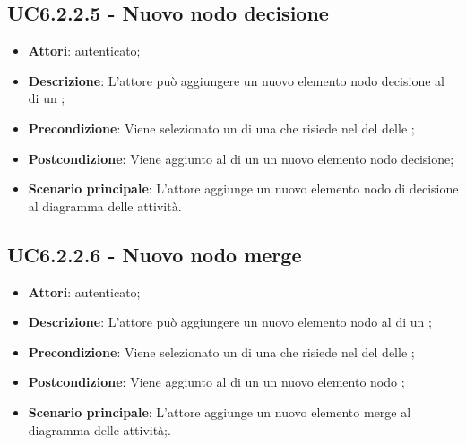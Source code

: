 \subsection{UC6.2.2.5 - Nuovo nodo decisione}
\label{ssec:UC6.2.2.5}
\begin{itemize}
\item \textbf{Attori}:  autenticato;
\item \textbf{Descrizione}: L'attore può aggiungere un nuovo elemento nodo decisione al  di un ;
\item \textbf{Precondizione}: Viene selezionato un  di una  che risiede nel  del  delle  ;
\item \textbf{Postcondizione}: Viene aggiunto al  di un  un nuovo elemento nodo decisione;
\item \textbf{Scenario principale}: L'attore aggiunge un nuovo elemento nodo di decisione al diagramma delle attività.
\end{itemize}
\subsection{UC6.2.2.6 - Nuovo nodo merge}
\label{ssec:UC6.2.2.6}
\begin{itemize}
\item \textbf{Attori}:  autenticato;
\item \textbf{Descrizione}: L'attore può aggiungere un nuovo elemento nodo  al  di un ;
\item \textbf{Precondizione}: Viene selezionato un  di una  che risiede nel  del  delle  ;
\item \textbf{Postcondizione}: Viene aggiunto al  di un  un nuovo elemento nodo ;
\item \textbf{Scenario principale}: L'attore aggiunge un nuovo elemento merge al diagramma delle attività;.
\end{itemize}
